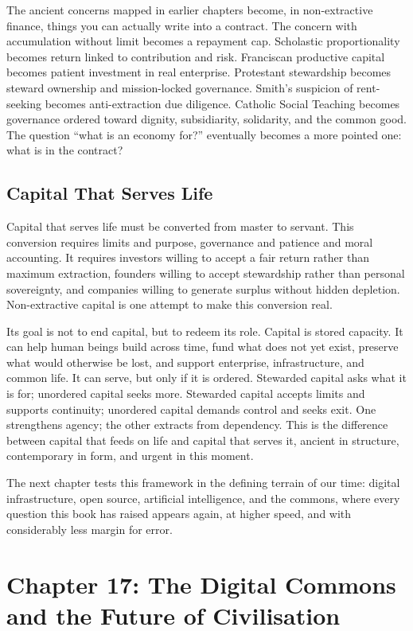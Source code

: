 \documentclass[11pt,a4paper,oneside]{book}
\begin{document}
The ancient concerns mapped in earlier chapters become, in non-extractive finance, things you can actually write into a contract. The concern with accumulation without limit becomes a repayment cap. Scholastic proportionality becomes return linked to contribution and risk. Franciscan productive capital becomes patient investment in real enterprise. Protestant stewardship becomes steward ownership and mission-locked governance. Smith's suspicion of rent-seeking becomes anti-extraction due diligence. Catholic Social Teaching becomes governance ordered toward dignity, subsidiarity, solidarity, and the common good. The question ``what is an economy for?'' eventually becomes a more pointed one: what is in the contract?

\section*{Capital That Serves Life}

Capital that serves life must be converted from master to servant. This conversion requires limits and purpose, governance and patience and moral accounting. It requires investors willing to accept a fair return rather than maximum extraction, founders willing to accept stewardship rather than personal sovereignty, and companies willing to generate surplus without hidden depletion. Non-extractive capital is one attempt to make this conversion real.

Its goal is not to end capital, but to redeem its role. Capital is stored capacity. It can help human beings build across time, fund what does not yet exist, preserve what would otherwise be lost, and support enterprise, infrastructure, and common life. It can serve, but only if it is ordered. Stewarded capital asks what it is for; unordered capital seeks more. Stewarded capital accepts limits and supports continuity; unordered capital demands control and seeks exit. One strengthens agency; the other extracts from dependency. This is the difference between capital that feeds on life and capital that serves it, ancient in structure, contemporary in form, and urgent in this moment.

The next chapter tests this framework in the defining terrain of our time: digital infrastructure, open source, artificial intelligence, and the commons, where every question this book has raised appears again, at higher speed, and with considerably less margin for error.

\chapter*{Chapter 17: The Digital Commons and the Future of Civilisation}
\end{document}
